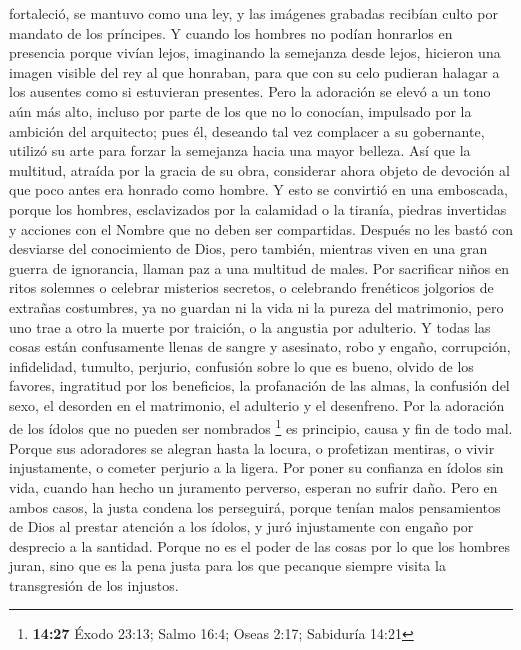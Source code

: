 fortaleció, se mantuvo como una ley, y las imágenes grabadas recibían
culto por mandato de los príncipes.  Y cuando los hombres
no podían honrarlos en presencia porque vivían lejos, imaginando la
semejanza desde lejos, hicieron una imagen visible del rey al que
honraban, para que con su celo pudieran halagar a los ausentes como si
estuvieran presentes.  Pero la adoración se elevó a un
tono aún más alto, incluso por parte de los que no lo conocían,
impulsado por la ambición del arquitecto;  pues él,
deseando tal vez complacer a su gobernante, utilizó su arte para forzar
la semejanza hacia una mayor belleza.  Así que la
multitud, atraída por la gracia de su obra, considerar ahora objeto de
devoción al que poco antes era honrado como hombre.  Y
esto se convirtió en una emboscada, porque los hombres, esclavizados por
la calamidad o la tiranía, piedras invertidas y acciones con el Nombre
que no deben ser compartidas.  Después no les bastó con
desviarse del conocimiento de Dios, pero también, mientras viven en una
gran guerra de ignorancia, llaman paz a una multitud de males.
 Por sacrificar niños en ritos solemnes o celebrar
misterios secretos, o celebrando frenéticos jolgorios de extrañas
costumbres,  ya no guardan ni la vida ni la pureza del
matrimonio, pero uno trae a otro la muerte por traición, o la angustia
por adulterio.  Y todas las cosas están confusamente
llenas de sangre y asesinato, robo y engaño, corrupción, infidelidad,
tumulto, perjurio,  confusión sobre lo que es bueno,
olvido de los favores, ingratitud por los beneficios, la profanación de
las almas, la confusión del sexo, el desorden en el matrimonio, el
adulterio y el desenfreno.  Por la adoración de los
ídolos que no pueden ser nombrados \footnote{\textbf{14:27} Éxodo 23:13;
  Salmo 16:4; Oseas 2:17; Sabiduría 14:21} es principio, causa y fin de
todo mal.  Porque sus adoradores se alegran hasta la
locura, o profetizan mentiras, o vivir injustamente, o cometer perjurio
a la ligera.  Por poner su confianza en ídolos sin vida,
cuando han hecho un juramento perverso, esperan no sufrir daño.
 Pero en ambos casos, la justa condena los perseguirá,
porque tenían malos pensamientos de Dios al prestar atención a los
ídolos, y juró injustamente con engaño por desprecio a la santidad.
 Porque no es el poder de las cosas por lo que los
hombres juran, sino que es la pena justa para los que pecanque siempre
visita la transgresión de los injustos.


